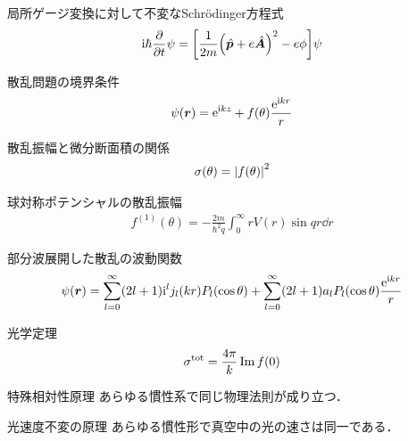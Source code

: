 \documentclass{report}
\begin{document}
\begin{itembox}[l]{局所ゲージ変換に対して不変なSchrödinger方程式}
  \begin{align}
    \mathrm{i}\hbar\pdv{t}\psi = \qty[\frac{1}{2m}\qty(\hat{\bm{p}} + e\hat{\bm{A}})^2 - e\phi]\psi
  \end{align}
\end{itembox}

\begin{itembox}[l]{散乱問題の境界条件}
  \begin{equation}
    \psi(\bm{r}) = \mathrm{e}^{\mathrm{i} kz} + f(\theta) \frac{\mathrm{e}^{\mathrm{i} kr}}{r}
  \end{equation}
\end{itembox}

\begin{itembox}[l]{散乱振幅と微分断面積の関係}
  \begin{align}
    \sigma(\theta) = \abs{f(\theta)}^2
  \end{align}
\end{itembox}

\begin{itembox}[l]{球対称ポテンシャルの散乱振幅}
  \begin{align}
    \label{SCamp1st}
    f^{(1)}(\theta) =  -\frac{2m}{\hbar^2 q} \int_{0}^{\infty} rV(r)\sin qr \dd{r}
  \end{align}
\end{itembox}

\begin{itembox}[l]{部分波展開した散乱の波動関数}
  \begin{align}
    \label{PartialWave}
    \psi(\bm{r}) = \sum_{l=0}^{\infty} (2l+1)\mathrm{i}^l j_l(kr)P_l(\cos\theta) + \sum_{l=0}^{\infty} (2l+1)a_l P_l(\cos\theta) \frac{\mathrm{e}^{\mathrm{i} kr}}{r}
  \end{align}
\end{itembox}

  \begin{itembox}[l]{光学定理}
    \begin{align}
      \sigma^{\mathrm{tot}} = \frac{4\pi}{k} \Im f(0)
    \end{align}
  \end{itembox}

  \begin{itembox}[l]{特殊相対性原理}
    あらゆる慣性系で同じ物理法則が成り立つ．
  \end{itembox}

  \begin{itembox}[l]{光速度不変の原理}
    あらゆる慣性形で真空中の光の速さは同一である．
  \end{itembox}
\end{document}
